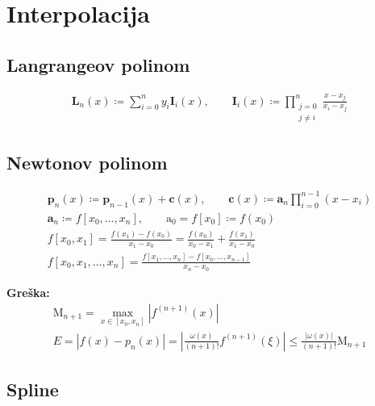 \section{Interpolacija}

\subsection{Langrangeov polinom}

\begin{gather*}
    {\mathbf L}_n(x) \coloneq \sum_{i=0}^{n} y_i\mathbf{I}_i(x),\qquad
    {\mathbf I}_i(x) \coloneq \prod_{\substack{j=0\\j\neq i}}^{n} \frac{x-x_j}{x_i-x_j}
\end{gather*}

\subsection{Newtonov polinom}

\begin{gather*}
    \mathbf{p}_n(x) \coloneq \mathbf{p}_{n-1}(x) + \mathbf{c}(x),\qquad \mathbf{c}(x) \coloneq {\mathbf a}_n\prod_{i=0}^{n-1}(x-x_i)\\
    \mathbf{a}_n \coloneq f[x_0,\dots,x_n], \qquad \mathrm{a}_0 = f[x_0] \coloneq f(x_0)\\
    f[x_0, x_1] = \frac{f(x_1)-f(x_0)}{x_1 - x_0} = \frac{f(x_0)}{x_0 - x_1} + \frac{f(x_1)}{x_1 - x_0}\\
    f[x_0, x_1, \dots, x_n] = \frac{f[x_1, \dots, x_n]- f[x_0, \dots, x_{n-1}]}{x_n - x_0}
\end{gather*}

\textbf{Greška:}
\vspace{-0.4cm}
\begin{gather*}
    \mathrm{M}_{n+1} = \max_{x\in[x_0,x_n]}\left|f^{(n+1)}(x)\right|\\
    E = |f(x) - p_n(x)| = \left|\frac{\omega(x)}{(n + 1)!}f^{(n+1)}(\xi)\right| \leq \frac{|\omega(x)|}{(n+1)!}\mathrm{M}_{n+1}
\end{gather*}
$$$$

\subsection{Spline}

